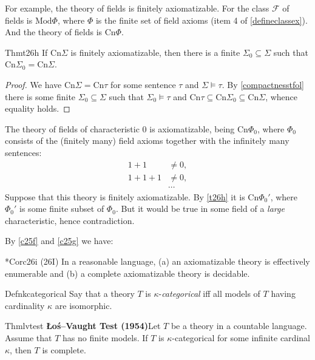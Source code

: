 For example, the theory of fields is finitely axiomatizable. For the class $\mathcal{F}$ of fields is $\mathrm{Mod}\Phi$, where $\Phi$ is the finite set of field axioms (item 4 of \ref{defineclassex}). And the theory of fields is $\mathrm{Cn}\Phi$.

\begin{reference}{Thm}{t26h}
  If $\mathrm{Cn}\Sigma$ is finitely axiomatizable, then there is a finite $\Sigma_0\subseteq \Sigma$ such that $\mathrm{Cn}\Sigma_0=\mathrm{Cn}\Sigma$.
\end{reference}

\begin{proof}
  We have $\mathrm{Cn}\Sigma=\mathrm{Cn}\tau$ for some sentence $\tau$ and $\Sigma\vDash \tau$. By \ref{compactnesstfol} there is some finite $\Sigma_0\subseteq \Sigma$ such that $\Sigma_0\vDash \tau$ and $\mathrm{Cn}\tau\subseteq\mathrm{Cn}\Sigma_0 \subseteq \mathrm{Cn}\Sigma$, whence equality holds.
\end{proof}

The theory of fields of characteristic 0 is axiomatizable, being $\mathrm{Cn}\Phi_0$, where $\Phi_0$ consists of the (finitely many) field axioms together with the infinitely many sentences:
\begin{align*}
  1+1   & \neq 0, \\
  1+1+1 & \neq 0, \\
        & \cdots
\end{align*}
Suppose that this theory is finitely axiomatizable. By \ref{t26h} it is $\mathrm{Cn}\Phi_0'$, where $\Phi_0'$ is some finite subset of $\Phi_0$. But it would be true in some field of a \textit{large} characteristic, hence contradiction.

By \ref{c25f} and \ref{c25g} we have:

\begin{reference}{*Cor}{c26i}
  (26I) In a reasonable language, (a) an axiomatizable theory is effectively enumerable and (b) a complete axiomatizable theory is decidable.
\end{reference}

\begin{reference}{Defn}{kcategorical}
  Say that a theory $T$ is $\kappa$-\textit{categorical} iff all models of $T$ having cardinality $\kappa$ are isomorphic.
\end{reference}

\begin{reference}{Thm}{lvtest}
  \textbf{Łoś--Vaught Test (1954)}\quad Let $T$ be a theory in a countable language. Assume that $T$ has no finite models. If $T$ is $\kappa$-categorical for some infinite cardinal $\kappa$, then $T$ is complete.
\end{reference}

